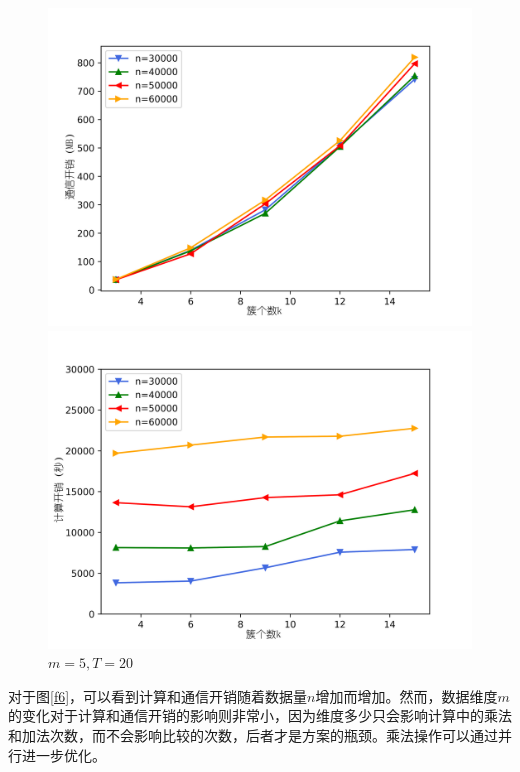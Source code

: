 \begin{figure}[htbp]
	\begin{minipage}[t]{0.5\linewidth}
		\includegraphics[width=\linewidth]{img/k.png}

	\end{minipage}%
	\hfill%
	\begin{minipage}[t]{0.5\linewidth}
		\includegraphics[width=\linewidth]{img/k_comm.png}

	\end{minipage}
	\caption{$m=5, T=20$}
	\label{f7}
\end{figure}

对于图\ref{f6}，可以看到计算和通信开销随着数据量$ n $增加而增加。然而，数据维度$ m $的变化对于计算和通信开销的影响则非常小，因为维度多少只会影响计算中的乘法和加法次数，而不会影响比较的次数，后者才是方案的瓶颈。乘法操作可以通过并行进一步优化。

